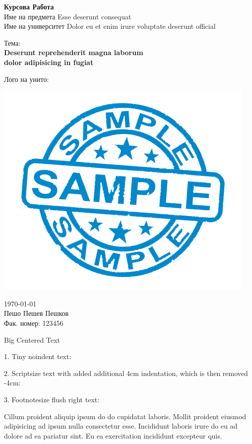 \documentclass[12pt]{article}
\begin{document}
\begin{titlepage}
    \begin{center}
        \Large
        \textbf{Курсова Работа} \\
        Име на предмета Esse deserunt consequat \\
        \vspace*{0.2cm}
        \large
        Име на университет Dolor eu et enim irure voluptate deserunt official \\
        \vspace*{3cm}

        \Large
        Тема: \\
        \huge
        \textbf{Deserunt reprehenderit magna laborum \\ dolor adipisicing in fugiat}

        \vfill

        \large
        Лого на унито:
        \begin{center}
            \includegraphics[width=0.3\linewidth]{sample.png}
        \end{center}

        \large \vfill
        \today \\
        Пешо Пешев Пешков \\
        Фак. номер: 123456
    \end{center}
\end{titlepage}

\newpage

\begin{center}
    {\Huge Big Centered Text}
\end{center}

1. Tiny noindent text: \\
{\tiny\noindent\Blindtext[1][1]}

2. Scriptsize text with added additional 4cm indentation, which is then removed -4cm:

\addtolength{\parindent}{4cm}
{\scriptsize\Blindtext[1][1]}
\addtolength{\parindent}{-4cm}

3. Footnotesize flush right text:
\begin{flushright}
{\footnotesize Cillum proident aliquip ipsum do do cupidatat laboris. Mollit proident eiusmod adipisicing ad ipsum nulla consectetur esse. Incididunt laboris irure do eu ad dolore ad ea pariatur sint. Eu ea exercitation incididunt excepteur quis.}
\end{flushright}
\end{document}
